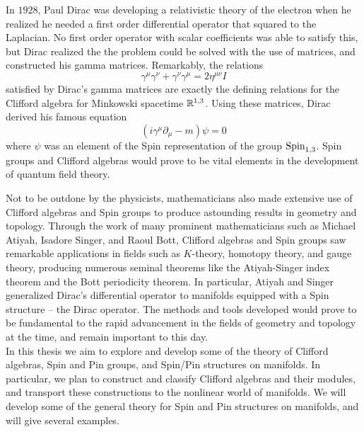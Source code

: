 In $1928$, Paul Dirac was developing a relativistic theory of the electron
when he realized he needed a first order differential operator that squared
to the Laplacian. No first order operator with scalar coefficients was able
to satisfy this, but Dirac realized the the problem could be solved with
the use of matrices, and constructed his gamma matrices. Remarkably, the
relations
\[
\gamma^\mu\gamma^\nu + \gamma^\nu\gamma^\mu = 2\eta^{\mu\nu}I
\]
satisfied by Dirac's gamma matrices are exactly the defining relations for the
Clifford algebra for Minkowski spacetime $\mathbb{R}^{1,3}$. Using these matrices, Dirac
derived his famous equation
\[
(i\gamma^\mu\partial_\mu -m)\psi = 0
\]
where $\psi$ was an element of the Spin representation of the group $\mathrm{Spin}_{1,3}$.
Spin groups and Clifford algebras would prove to be vital elements in the development
of quantum field theory.

Not to be outdone by the physicists, mathematicians also made extensive use
of Clifford algebras and Spin groups to produce astounding results in geometry
and topology. Through the work of many prominent mathematicians such as Michael
Atiyah, Isadore Singer, and Raoul Bott, Clifford algebras and Spin groups saw
remarkable applications in fields such as $K$-theory, homotopy theory, and
gauge theory, producing numerous seminal theorems like the Atiyah-Singer index
theorem and the Bott periodicity theorem. In particular, Atiyah and Singer
generalized Dirac's differential operator to manifolds equipped with a Spin
structure -- the Dirac operator. The methods and tools developed would prove
to be fundamental to the rapid advancement in the fields of geometry and topology
at the time, and remain important to this day. \\

In this thesis we aim to explore and develop some of the theory of
Clifford algebras, Spin and Pin groups, and Spin/Pin structures on manifolds.
In particular, we plan to construct and classify Clifford algebras and their
modules, and transport these constructions to the nonlinear world of manifolds.
We will develop some of the general theory for Spin and Pin structures on manifolds,
and will give several examples.
%